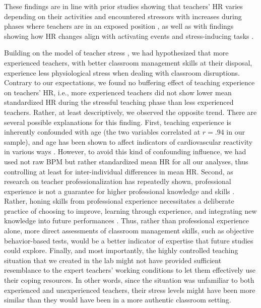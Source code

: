 \documentclass[preprint, 3p,
sort,]{elsarticle} %
\begin{document}
These findings are in line with prior studies showing that teachers' HR
varies depending on their activities and encountered stressors with
increases during phases where teachers are in an exposed position
\citep{sperka1995, scheuch1997psychophysische, donker2018, junker2021},
as well as with findings showing how HR changes align with activating
events and stress-inducing tasks \citep{Darnell2019, chalmers2021}.

Building on the model of teacher stress \citep[see Fig.
2]{kyriacou1978}, we had hypothesized that more experienced teachers,
with better classroom management skills at their disposal, experience
less physiological stress when dealing with classroom disruptions.
Contrary to our expectations, we found no buffering effect of teaching
experience on teachers' HR, i.e., more experienced teachers did not show
lower mean standardized HR during the stressful teaching phase than less
experienced teachers. Rather, at least descriptively, we observed the
opposite trend. There are several possible explanations for this
finding. First, teaching experience is inherently confounded with age
(the two variables correlated at \(r = .94\) in our sample), and age has
been shown to affect indicators of cardiovascular reactivity in various
ways \citep{uchino2010older}. However, to avoid this kind of confounding
influence, we had used not raw BPM but rather standardized mean HR for
all our analyses, thus controlling at least for inter-individual
differences in mean HR. Second, as research on teacher
professionalization has repeatedly shown, professional experience is not
a guarantee for higher professional knowledge and skills
\citep{kirschner2016professionswissen}. Rather, honing skills from
professional experience necessitates a deliberate practice of choosing
to improve, learning through experience, and integrating new knowledge
into future performances \citep{dunn1999deliberate}. Thus, rather than
professional experience alone, more direct assessments of classroom
management skills, such as objective behavior-based tests, would be a
better indicator of expertise that future studies could explore.
Finally, and most importantly, the highly controlled teaching situation
that we created in the lab might not have provided sufficient
resemblance to the expert teachers' working conditions to let them
effectively use their coping resources. In other words, since the
situation was unfamiliar to both experienced and unexperienced teachers,
their stress levels might have been more similar than they would have
been in a more authentic classroom setting.
\end{document}
